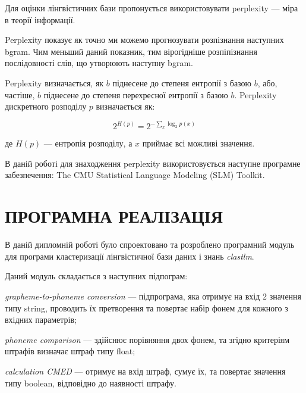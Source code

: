 \documentclass{diploma}
\begin{document}
Для оцінки лінгвістичних бази пропонується використовувати perplexity --- міра в теорії інформації. 

Perplexity показує як точно ми можемо прогнозувати розпізнання наступних bgram. Чим меньший даний показник, тим вірогідніше розпіпізнання послідовності слів, що утворюють наступну bgram.

Perplexity визначається, як $b$ піднесене до степеня ентропії з базою $b$, або, частіше, $b$ піднесене до степеня перехресної ентропії з базою $b$. Perplexity дискретного розподілу $p$ визначається як:

\begin{equation}
\label{eq9}
2^{H(p)}=2^{-\sum_x \log_2 p(x)}
\end{equation}

де $H(p)$ --- ентропія розподілу, а $x$ приймає всі можливі значення.~\cite{u1}

В даній роботі для знаходження perplexity використовується наступне програмне забезпечення: The CMU Statistical Language Modeling (SLM) Toolkit.

 







\chapter{ПРОГРАМНА РЕАЛІЗАЦІЯ}

В даній дипломній роботі було спроектовано та розроблено програмний модуль для програми кластеризації лінгвістичної бази даних і знань \emph{clastlm}.

Даний модуль складається з наступних підпограм:

\begin{itemizer}
\item \emph{grapheme-to-phoneme conversion} --- підпрограма, яка отримує на вхід 2 значення типу string, проводить їх претворення та повертає набір фонем для кожного з вхідних параметрів;
\item \emph{phoneme comparison} --- здійснює порівняння двох фонем, та згідно критеріям штрафів визначає штраф типу float;
\item \emph{calculation CMED} --- отримує на вхід штраф, сумує їх, та повертає значення типу boolean, відповідно до наявності штрафу.
\end{itemizer}

\end{document}
